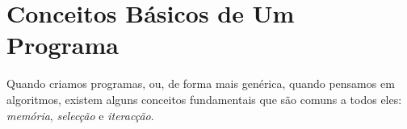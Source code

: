 %
%

\section{Conceitos Básicos de Um Programa}
Quando criamos programas, ou, de forma mais genérica, quando pensamos em algoritmos, existem alguns conceitos fundamentais que são comuns a todos eles: \emph{memória}, \emph{selecção} e \emph{iteracção}.

